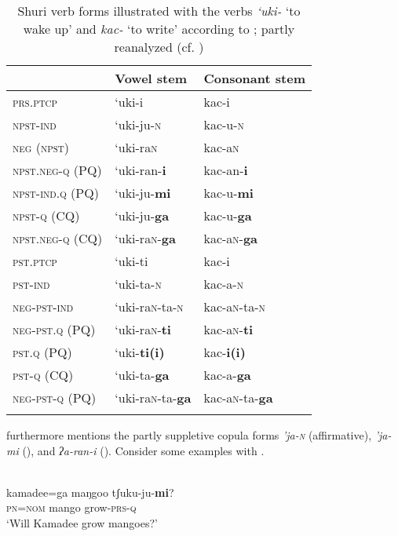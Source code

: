 \begin{table}
\caption{Shuri verb forms illustrated with the verbs \textit{‘uki-} ‘to wake up’ and \textit{kac-} ‘to write’ according to \citet[180f., passim]{Arakaki2003}; partly reanalyzed (cf. \citealt{Uemura2003})}
\label{tab:japa:2}

\begin{tabularx}{\textwidth}{XXl}
\lsptoprule
& \textbf{Vowel stem} & \textbf{Consonant stem}\\
\midrule
\textsc{prs.ptcp} & ‘uki-i & kac-i\\
\textsc{npst-ind} & ‘uki-ju-\textsc{n} & kac-u-\textsc{n}\\
\textsc{neg (npst)} & ‘uki-ra\textsc{n} & kac-a\textsc{n}\\
\textsc{npst.neg-q (PQ)} & ‘uki-ran-\textbf{i} & kac-an-\textbf{i}\\
\textsc{npst-ind.q (PQ)} & ‘uki-ju-\textbf{mi} & kac-u-\textbf{mi}\\
\textsc{npst-q (CQ)} & ‘uki-ju-\textbf{ga} & kac-u-\textbf{ga}\\
\textsc{npst.neg-q (CQ)} & ‘uki-ra\textsc{n}-\textbf{ga} & kac-a\textsc{n}-\textbf{ga}\\
\textsc{pst.ptcp} & ‘uki-ti & kac-i\\
\textsc{pst-ind} & ‘uki-ta-\textsc{n} & kac-a-\textsc{n}\\
\textsc{neg-pst-ind} & ‘uki-ra\textsc{n-}ta-\textsc{n} & kac-a\textsc{n-}ta-\textsc{n}\\
\textsc{neg-pst.q (PQ)} & ‘uki-ra\textsc{n-}\textbf{ti} & kac-a\textsc{n-}\textbf{ti}\\
\textsc{pst.q (PQ)} & ‘uki-\textbf{ti(i)} & kac-\textbf{i(i)}\\
\textsc{pst-q (CQ)} & ‘uki-ta-\textbf{ga} & kac-a-\textbf{ga}\\
\textsc{neg-pst-q (PQ)} & ‘uki-ra\textsc{n-}ta-\textbf{ga} & kac-a\textsc{n-}ta-\textbf{ga}\\
\lspbottomrule
\end{tabularx}
\end{table}

\citet[95]{Uemura2003} furthermore mentions the partly suppletive copula forms \textit{’ja-\textsc{n}} (affirmative), \textit{’ja-mi} (), and \textit{ʔa-ran-i} (). Consider some examples with  .

\newpage 
\ea%
    \label{ex:japa:26}
    \\
    \ea
    \gll kamadee=ga  maŋgoo  tʃuku-ju-\textbf{{mi}}?\\
    \textsc{pn}=\textsc{nom}  mango    grow-\textsc{prs}-\textsc{q}\\
    \glt ‘Will Kamadee grow mangoes?’
    
